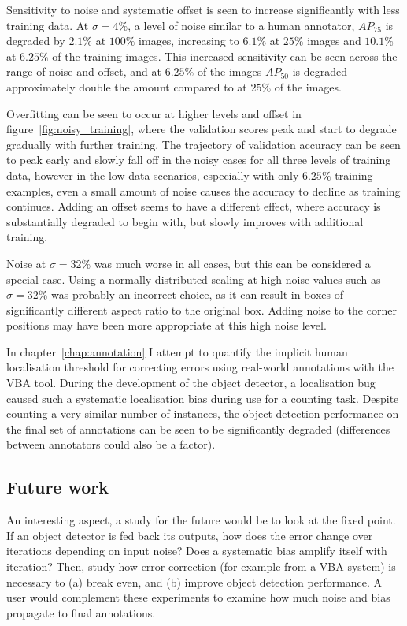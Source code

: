 Sensitivity to noise and systematic offset is seen to increase significantly with less training data. At $\sigma=4\%$, a level of noise similar to a human annotator, $AP_{75}$ is degraded by $2.1\%$ at $100\%$ images, increasing to $6.1\%$ at $25\%$ images and $10.1\%$ at $6.25\%$ of the training images. This increased sensitivity can be seen across the range of noise and offset, and at $6.25\%$ of the images $AP_{50}$ is degraded approximately double the amount compared to at $25\%$ of the images.

Overfitting can be seen to occur at higher levels and offset in figure~\ref{fig:noisy_training}, where the validation scores peak and start to degrade gradually with further training. The trajectory of validation accuracy can be seen to peak early and slowly fall off in the noisy cases for all three levels of training data, however in the low data scenarios, especially with only $6.25\%$ training examples, even a small amount of noise causes the accuracy to decline as training continues. Adding an offset seems to have a different effect, where accuracy is substantially degraded to begin with, but slowly improves with additional training.

Noise at $\sigma = 32\%$ was much worse in all cases, but this can be considered a special case. Using a normally distributed scaling at high noise values such as $\sigma = 32\%$ was probably an incorrect choice, as it can result in boxes of significantly different aspect ratio to the original box. Adding noise to the corner positions may have been more appropriate at this high noise level.

In chapter~\ref{chap:annotation} I attempt to quantify the implicit human localisation threshold for correcting errors using real-world annotations with the \gls{VBA} tool. During the development of the object detector, a localisation bug caused such a systematic localisation bias during use for a counting task. Despite counting a very similar number of instances, the object detection performance on the final set of annotations can be seen to be significantly degraded (differences between annotators could also be a factor).

\subsection{Future work}

An interesting aspect, a study for the future would be to look at the fixed point. If an object detector is fed back its outputs, how does the error change over iterations depending on input noise? Does a systematic bias amplify itself with iteration? Then, study how error correction (for example from a \gls{VBA} system) is necessary to (a) break even, and (b) improve object detection performance. A user would complement these experiments to examine how much noise and bias propagate to final annotations.

